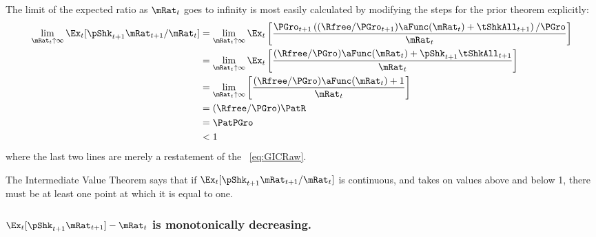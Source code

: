 \documentclass[\econtexRoot/BufferStockTheory]{subfiles}
\begin{document}
The limit of the expected ratio as $\mRat_{t}$ goes to infinity is most easily calculated by modifying the steps for the prior theorem explicitly:
\begin{equation}\begin{gathered}\begin{aligned}
  \lim_{\mRat_{t} \uparrow \infty} \Ex_{t}[\pShk_{t+1}\mRat_{t+1}/\mRat_{t}]  & =   
                                                                  \lim_{\mRat_{t} \uparrow \infty} 
                                                                  \Ex_{t}\left[\frac{\PGro_{t+1}\left((\Rfree/\PGro_{t+1})\aFunc(\mRat_{t})+{\tShkAll}_{t+1}\right)/\PGro}{\mRat_{t}}\right] \notag 
  \\   & =   \lim_{\mRat_{t} \uparrow \infty} \Ex_{t}\left[
         \frac{(\Rfree/\PGro)\aFunc(\mRat_{t})+\pShk_{t+1}{\tShkAll}_{t+1}}{\mRat_{t}}
         \right] \notag 
  \\   & =   \lim_{\mRat_{t} \uparrow \infty} \left[
         \frac{(\Rfree/\PGro)\aFunc(\mRat_{t})+1}{\mRat_{t}}
         \right] \notag 
  \\  & = (\Rfree/\PGro)\PatR \label{eq:emgro2}
  \\  & = \PatPGro \notag
  \\  & < 1 \notag
\end{aligned}\end{gathered}\end{equation}
where the last two lines are merely a restatement of the \GICRaw~\eqref{eq:GICRaw}.

The Intermediate Value Theorem says that if $\Ex_{t}[\pShk_{t+1}\mRat_{t+1}/\mRat_t]$ is continuous, and takes on values above and below 1, there must be at least one point at which it is equal to one.

\subsubsection{$\Ex_{t}[\pShk_{t+1}\mRat_{t+1}] -\mRat_t$ is monotonically decreasing.}
\end{document}
